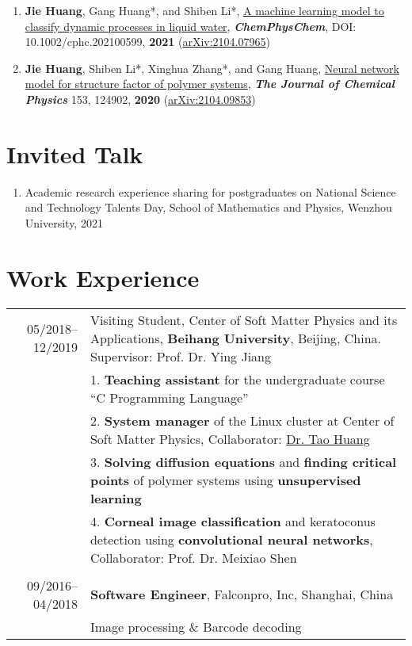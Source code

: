 \documentclass[a4paper,10pt]{article} %
\begin{document}
\begin{small}
\begin{enumerate}
\item \textbf{Jie Huang}, Gang Huang*, and Shiben Li*, \href{https://chemistry-europe.onlinelibrary.wiley.com/doi/abs/10.1002/cphc.202100599}{A machine learning model to classify dynamic processes in liquid water},   \textbf{\emph{ChemPhysChem}}, DOI: 10.1002/cphc.202100599,  \textbf{2021} (\href{https://arxiv.org/abs/2104.07965}{arXiv:2104.07965})

\item \textbf{Jie Huang}, Shiben Li*, Xinghua Zhang*, and Gang Huang, \href{https://aip.scitation.org/doi/10.1063/5.0022464}{Neural network model for structure factor of polymer systems},  \textbf{\emph{The Journal of Chemical Physics}} 153, 124902, \textbf{2020} (\href{https://arxiv.org/abs/2104.09853}{arXiv:2104.09853})
\end{enumerate}
\end{small}

\section{Invited Talk}  
\begin{small}
	\begin{enumerate}
		\item Academic research experience sharing for postgraduates on National Science and Technology Talents Day, School of Mathematics and Physics, Wenzhou University, 2021
	\end{enumerate}
\end{small}

\section{Work Experience}
\begin{tabular}{r|p{11cm}}
	05/2018--12/2019            & Visiting Student,  Center of Soft Matter Physics and its Applications, \textbf{Beihang University}, Beijing, China. Supervisor: Prof. Dr. Ying Jiang  \\
	& 1. \textbf{Teaching assistant} for the undergraduate course “C Programming Language” \\
	& 2. \textbf{System manager} of the Linux cluster at Center of Soft Matter Physics, Collaborator: \href{http://taohonker.science/}{Dr. Tao Huang}\\
	& 3. \textbf{Solving diffusion equations} and \textbf{finding critical points} of polymer systems using \textbf{unsupervised learning}\\
	& 4. \textbf{Corneal image classification} and keratoconus detection using \textbf{convolutional neural networks}, Collaborator: Prof. Dr. Meixiao Shen\\
	\multicolumn{2}{c}{} \\	%
	09/2016--04/2018            & \textbf{Software Engineer}, Falconpro, Inc, Shanghai, China \\                          & \footnotesize{Image processing \& Barcode} decoding					
\end{tabular}
\end{document}
